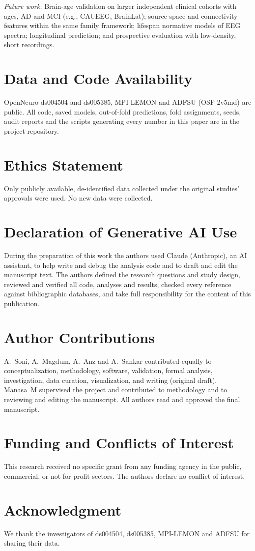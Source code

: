 \documentclass[journal]{IEEEtran}
\begin{document}
\emph{Future work.} Brain-age validation on larger independent clinical cohorts with ages, AD and MCI (e.g., CAUEEG, BrainLat); source-space and connectivity features within the same family framework; lifespan normative models of EEG spectra; longitudinal prediction; and prospective evaluation with low-density, short recordings.

\section*{Data and Code Availability}
OpenNeuro ds004504 and ds005385, MPI-LEMON and ADFSU (OSF 2v5md) are public. All code, saved models, out-of-fold predictions, fold assignments, seeds, audit reports and the scripts generating every number in this paper are in the project repository.

\section*{Ethics Statement}
Only publicly available, de-identified data collected under the original studies' approvals were used. No new data were collected.

\section*{Declaration of Generative AI Use}
During the preparation of this work the authors used Claude (Anthropic), an AI assistant, to help write and debug the analysis code and to draft and edit the manuscript text. The authors defined the research questions and study design, reviewed and verified all code, analyses and results, checked every reference against bibliographic databases, and take full responsibility for the content of this publication.

\section*{Author Contributions}
A.~Soni, A.~Magdum, A.~Anz and A.~Sankar contributed equally to conceptualization, methodology, software, validation, formal analysis, investigation, data curation, visualization, and writing (original draft). Manasa~M supervised the project and contributed to methodology and to reviewing and editing the manuscript. All authors read and approved the final manuscript.

\section*{Funding and Conflicts of Interest}
This research received no specific grant from any funding agency in the public, commercial, or not-for-profit sectors. The authors declare no conflict of interest.

\section*{Acknowledgment}
We thank the investigators of ds004504, ds005385, MPI-LEMON and ADFSU for sharing their data.



\end{document}
